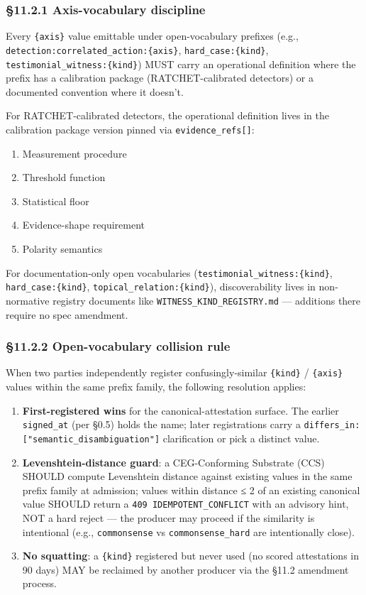 \documentclass[10pt]{article}
\begin{document}
\subsubsection*{§11.2.1 Axis-vocabulary discipline}


Every \texttt{\{axis\}} value emittable under open-vocabulary prefixes (e.g., \texttt{detection:correlated\_action:\{axis\}}, \texttt{hard\_case:\{kind\}}, \texttt{testimonial\_witness:\{kind\}}) MUST carry an operational definition where the prefix has a calibration package (RATCHET-calibrated detectors) or a documented convention where it doesn't.


For RATCHET-calibrated detectors, the operational definition lives in the calibration package version pinned via \texttt{evidence\_refs[]}:


\begin{enumerate}\setlength\itemsep{0pt}
\item Measurement procedure
\item Threshold function
\item Statistical floor
\item Evidence-shape requirement
\item Polarity semantics
\end{enumerate}


For documentation-only open vocabularies (\texttt{testimonial\_witness:\{kind\}}, \texttt{hard\_case:\{kind\}}, \texttt{topical\_relation:\{kind\}}), discoverability lives in non-normative registry documents like \texttt{WITNESS\_KIND\_REGISTRY.md} — additions there require no spec amendment.


\subsubsection*{§11.2.2 Open-vocabulary collision rule}


When two parties independently register confusingly-similar \texttt{\{kind\}} / \texttt{\{axis\}} values within the same prefix family, the following resolution applies:


\begin{enumerate}\setlength\itemsep{0pt}
\item \textbf{First-registered wins} for the canonical-attestation surface. The earlier \texttt{signed\_at} (per §0.5) holds the name; later registrations carry a \texttt{differs\_in: ["semantic\_disambiguation"]} clarification or pick a distinct value.
\item \textbf{Levenshtein-distance guard}: a CEG-Conforming Substrate (CCS) SHOULD compute Levenshtein distance against existing values in the same prefix family at admission; values within distance ≤ 2 of an existing canonical value SHOULD return a \texttt{409 IDEMPOTENT\_CONFLICT} with an advisory hint, NOT a hard reject — the producer may proceed if the similarity is intentional (e.g., \texttt{commonsense} vs \texttt{commonsense\_hard} are intentionally close).
\item \textbf{No squatting}: a \texttt{\{kind\}} registered but never used (no scored attestations in 90 days) MAY be reclaimed by another producer via the §11.2 amendment process.
\end{enumerate}
\end{document}
